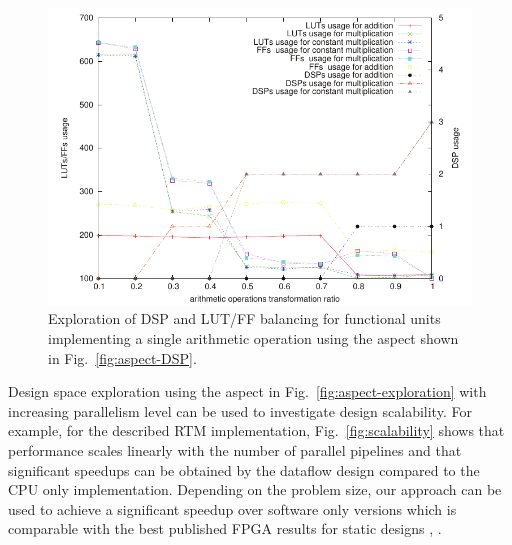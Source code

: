 \begin{figure}[!h]
\centering
\includegraphics{figs/arith}
\caption{Exploration of DSP and LUT/FF balancing for functional units
  implementing a single arithmetic operation using the aspect shown
  in Fig.~\ref{fig:aspect-DSP}.}
\label{fig:arith}
\end{figure}



Design space exploration using the aspect in
Fig.~\ref{fig:aspect-exploration} with increasing parallelism level
can be used to investigate design scalability. For example, for the
described RTM implementation, Fig.~\ref{fig:scalability} shows that
performance scales linearly with the number of parallel pipelines and
that significant speedups can be obtained by the \FAST{} dataflow
design compared to the CPU only implementation. Depending on the
problem size, our approach can be used to achieve a significant
speedup over software only versions which is comparable with the best
published FPGA results for static designs
\cite{Xinyu:Qiwei:Luk:Qiang:Pell:2012}, \cite{araya2011assessing}.





